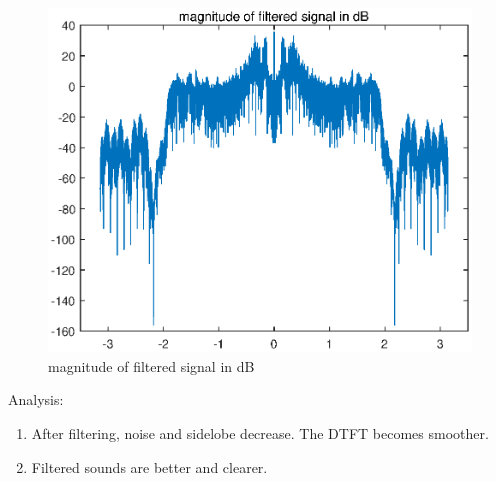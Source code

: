 \documentclass[onecolumn,oneside]{SUSTechHomework}
\begin{document}
\begin{figure}[H]
	\centering
	\includegraphics[width=150mm]{pictures/win3.eps}
	\caption{magnitude of filtered signal in dB}
\end{figure}
Analysis:
\begin{enumerate}
	\item After filtering, noise and sidelobe decrease. The DTFT becomes smoother.
	\item Filtered sounds are better and clearer.
\end{enumerate}
\end{document}
